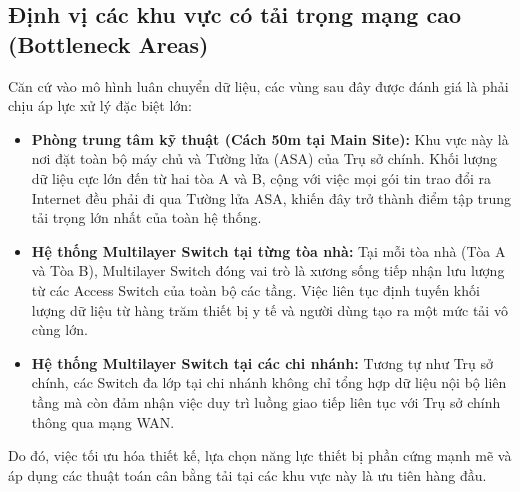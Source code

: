 \subsection{Định vị các khu vực có tải trọng mạng cao (Bottleneck Areas)}
Căn cứ vào mô hình luân chuyển dữ liệu, các vùng sau đây được đánh giá là phải chịu áp lực xử lý đặc biệt lớn:
\begin{itemize}
    \item \textbf{Phòng trung tâm kỹ thuật (Cách 50m tại Main Site):} Khu vực này là nơi đặt toàn bộ máy chủ và Tường lửa (ASA) của Trụ sở chính. Khối lượng dữ liệu cực lớn đến từ hai tòa A và B, cộng với việc mọi gói tin trao đổi ra Internet đều phải đi qua Tường lửa ASA, khiến đây trở thành điểm tập trung tải trọng lớn nhất của toàn hệ thống.
    \item \textbf{Hệ thống Multilayer Switch tại từng tòa nhà:} Tại mỗi tòa nhà (Tòa A và Tòa B), Multilayer Switch đóng vai trò là xương sống tiếp nhận lưu lượng từ các Access Switch của toàn bộ các tầng. Việc liên tục định tuyến khối lượng dữ liệu từ hàng trăm thiết bị y tế và người dùng tạo ra một mức tải vô cùng lớn.
    \item \textbf{Hệ thống Multilayer Switch tại các chi nhánh:} Tương tự như Trụ sở chính, các Switch đa lớp tại chi nhánh không chỉ tổng hợp dữ liệu nội bộ liên tầng mà còn đảm nhận việc duy trì luồng giao tiếp liên tục với Trụ sở chính thông qua mạng WAN.
\end{itemize}

\indent Do đó, việc tối ưu hóa thiết kế, lựa chọn năng lực thiết bị phần cứng mạnh mẽ và áp dụng các thuật toán cân bằng tải tại các khu vực này là ưu tiên hàng đầu.

